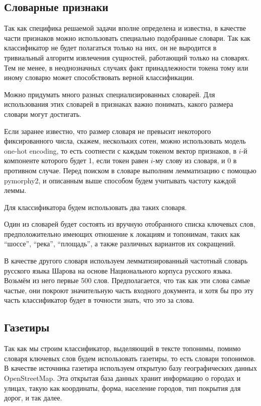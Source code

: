 \documentclass[14pt,russian]{extreport}
\begin{document}
\subsection{Словарные признаки}

Так как специфика решаемой задачи вполне определена и известна, в качестве
части признаков можно использовать специально подобранные словари. Так как
классификатор не будет полагаться только на них, он не выродится в тривиальный
алгоритм извлечения сущностей, работающий только на словарях. Тем не менее, в
неоднозначных случаях факт принадлежности токена тому или иному словарю может
способствовать верной классификации\cite{cohen2004exploiting}.

Можно придумать много разных специализированных словарей. Для использования
этих словарей в признаках важно понимать, какого размера словари могут
достигать.

Если заранее известно, что размер словаря не превысит некоторого фиксированного
числа, скажем, нескольких сотен, можно использовать модель one-hot encoding, то
есть соотнести с каждым токеном вектор признаков, в $i$-й компоненте которого
будет 1, если токен равен $i$-му слову из словаря, и 0 в противном случае.
Перед поиском в словаре выполним лемматизацию с помощью pymorphy2, и описанным
выше способом будем учитывать частоту каждой леммы.

Для классификатора будем использовать два таких словаря.

Один из словарей будет состоять из вручную отобранного списка ключевых слов,
предположительно имеющих отношение к локациям и топонимам, таких как ``шоссе'',
``река'', ``площадь'', а также различных вариантов их сокращений.

В качестве другого словаря используем лемматизированный частотный словарь
русского языка Шарова\cite{sharoff2002frequency} на основе Национального
корпуса русского языка. Возьмём
из него первые 500 слов. Предполагается, что так как эти слова самые частые,
они покроют значительную часть входного документа, и хотя бы про эту часть
классификатор будет в точности знать, что это за слова.

\subsection{Газетиры}

Так как мы строим классификатор, выделяющий в тексте топонимы, помимо словаря
ключевых слов будем использовать газетиры, то есть словари топонимов. В
качестве источника газетира используем открытую базу географических данных
OpenStreetMap. Эта открытая база данных хранит информацию о городах и улицах,
такую как координаты, форма, население городов, тип покрытия для дорог, и так
далее.
\end{document}
